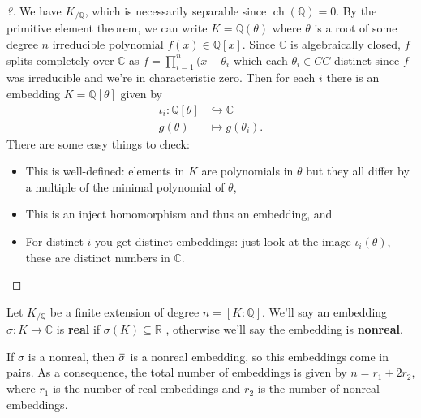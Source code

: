 \begin{proof}[?]

We have \(K_{/{\mathbb{Q}}}\), which is necessarily separable since
\(\operatorname{ch}({\mathbb{Q}}) = 0\). By the primitive element
theorem, we can write \(K = {\mathbb{Q}}(\theta)\) where \(\theta\) is a
root of some degree \(n\) irreducible polynomial
\(f(x) \in {\mathbb{Q}}[x]\). Since \({\mathbb{C}}\) is algebraically
closed, \(f\) splits completely over \({\mathbb{C}}\) as
\(f = \prod_{i=1}^n (x- \theta_i\) which each \(\theta_i \in CC\)
distinct since \(f\) was irreducible and we're in characteristic zero.
Then for each \(i\) there is an embedding \(K = {\mathbb{Q}}[\theta]\)
given by
\begin{align*}
\iota_i: {\mathbb{Q}}[\theta] &\hookrightarrow{\mathbb{C}}\\
g(\theta) &\mapsto g(\theta_i)
.\end{align*}
There are some easy things to check:

\begin{itemize}
\tightlist
\item
  This is well-defined: elements in \(K\) are polynomials in \(\theta\)
  but they all differ by a multiple of the minimal polynomial of
  \(\theta\),
\item
  This is an inject homomorphism and thus an embedding, and
\item
  For distinct \(i\) you get distinct embeddings: just look at the image
  \(\iota_i(\theta)\), these are distinct numbers in \({\mathbb{C}}\).
\end{itemize}

\end{proof}

\begin{definition}

Let \(K_{/{\mathbb{Q}}}\) be a finite extension of degree
\(n = [K : {\mathbb{Q}}]\). We'll say an embedding
\(\sigma:K \to {\mathbb{C}}\) is \textbf{real} if
\(\sigma(K) \subseteq {\mathbb{R}}\) , otherwise we'll say the embedding
is \textbf{nonreal}.

\end{definition}

\begin{remark}

If \(\sigma\) is a nonreal, then
\(\mkern 1.5mu\overline{\mkern-1.5mu\sigma\mkern-1.5mu}\mkern 1.5mu\) is
a nonreal embedding, so this embeddings come in pairs. As a consequence,
the total number of embeddings is given by \(n = r_1 + 2r_2\), where
\(r_1\) is the number of real embeddings and \(r_2\) is the number of
nonreal embeddings.

\end{remark}

